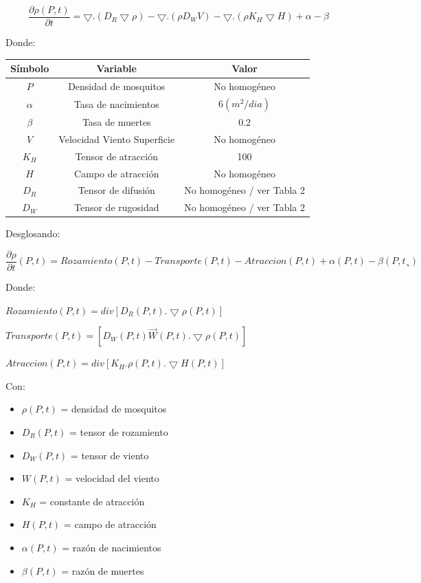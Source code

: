 $$\frac{\partial \rho(P,t)}{\partial t}=\bigtriangledown .(D_R \bigtriangledown \rho)-\bigtriangledown.(\rho D_W V)- \bigtriangledown . (\rho K_H \bigtriangledown H) + \alpha - \beta$$

Donde:

\onehalfspacing
\begin{center}
	\begin{tabular}{|c | c | c|} 
		\hline
		\textbf{Símbolo} & \textbf{Variable} & \textbf{Valor}\\
		\hline
		$$P$$ & Densidad de mosquitos & No homogéneo \\
		\hline
		$\alpha$  & Tasa de nacimientos & $6 (m^2/dia)$ \\
		\hline
		$\beta$  & Tasa de muertes             & 0.2 \\
		\hline
		$V$   & Velocidad Viento Superficie & No homogéneo \\
		\hline
		$K_H$   & Tensor de atracción         & 100 \\
		\hline
		$H$    & Campo de atracción          & No homogéneo \\
		\hline
		$D_R$   & Tensor de difusión          & No homogéneo / ver Tabla 2 \\
		\hline
		$D_W$   & Tensor de rugosidad         & No homogéneo / ver Tabla 2\\
		\hline
	\end{tabular}
\end{center}

Desglosando:

$$\frac{\partial \rho}{\partial t} (P,t)= Rozamiento(P,t)-Transporte(P,t)-Atraccion(P,t)+\alpha (P,t) - \beta (P,t¸)$$


Donde:
\doublespacing

$Rozamiento(P,t)=div[D_R (P,t) . \bigtriangledown \rho (P,t)]$

$Transporte(P,t)=[D_W (P,t) \vec{W} (P,t) . \bigtriangledown \rho (P,t)]$

$Atraccion(P,t) = div[K_H . \rho (P,t) . \bigtriangledown H (P,t)]$

\singlespacing

Con:

\begin{itemize}
	\item $\rho (P,t)$ = densidad de mosquitos
	\item $D_R (P,t)$ = tensor de rozamiento
	\item $D_W (P,t)$ = tensor de viento
	\item $W (P,t)$ = velocidad del viento
	\item $K_H$ = constante de atracción
	\item $H(P,t)$ = campo de atracción
	\item $\alpha (P,t)$ = razón de nacimientos
	\item $\beta (P,t)$ = razón de muertes
\end{itemize}

